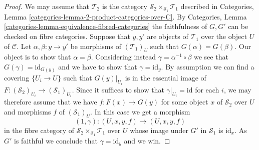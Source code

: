 \documentclass{stacks-project}
\theoremstyle{plain}
\theoremstyle{definition}
\theoremstyle{remark}
\numberwithin{equation}{subsection}
\begin{document}
\begin{proof}
We may assume that $\mathcal{T}_2$ is the category
$\mathcal{S}_2 \times_{\mathcal{S}_1} \mathcal{T}_1$
described in
Categories, Lemma \ref{categories-lemma-2-product-categories-over-C}.
By
Categories, Lemma \ref{categories-lemma-equivalence-fibred-categories}
the faithfulness of $G, G'$ can be checked on fibre categories.
Suppose that $y, y'$ are objects of $\mathcal{T}_1$ over the object $U$
of $\mathcal{C}$. Let $\alpha, \beta : y \to y'$ be morphisms of
$(\mathcal{T}_1)_U$ such that $G(\alpha) = G(\beta)$. Our object is to
show that $\alpha = \beta$. Considering instead
$\gamma = \alpha^{-1} \circ \beta$ we see that $G(\gamma) = \text{id}_{G(y)}$
and we have to show that $\gamma = \text{id}_y$. By assumption we
can find a covering $\{U_i \to U\}$ such that $G(y)|_{U_i}$ is in the
essential image of $F :(\mathcal{S}_2)_{U_i} \to (\mathcal{S}_1)_{U_i}$.
Since it suffices to show that $\gamma|_{U_i} = \text{id}$ for each $i$,
we may therefore assume that we have
$f : F(x) \to G(y)$ for some object $x$ of $\mathcal{S}_2$ over $U$
and morphisms $f$ of $(\mathcal{S}_1)_U$. In this case we get
a morphism
$$
(1, \gamma) : (U, x, y, f) \longrightarrow (U, x, y, f)
$$
in the fibre category of $\mathcal{S}_2 \times_{\mathcal{S}_1} \mathcal{T}_1$
over $U$ whose image under $G'$ in $\mathcal{S}_1$ is $\text{id}_x$.
As $G'$ is faithful we conclude that $\gamma = \text{id}_y$ and we win.
\end{proof}
\end{document}
